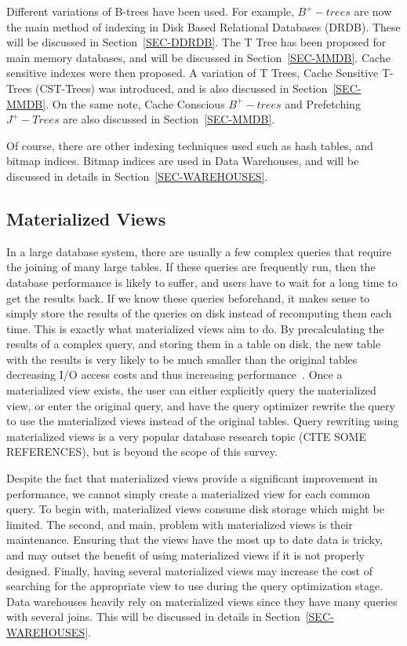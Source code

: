 \documentclass[12pt,a4paper]{article}
\begin{document}
Different variations of B-trees have been used. For example, $B^{+}-trees$ are now the main method of indexing in Disk Based Relational Databases (DRDB). These will be discussed in Section~\ref{SEC-DDRDB}. The T Tree has been proposed for main memory databases, and will be discussed in Section~\ref{SEC-MMDB}. Cache sensitive indexes were then proposed. A variation of T Trees, Cache Sensitive T-Trees (CST-Trees) was introduced, and is also discussed in Section~\ref{SEC-MMDB}. On the same note, Cache Conscious $B^{+}-trees$ and Prefetching $J^{+}-Trees$ are also discussed in Section~\ref{SEC-MMDB}. 

Of course, there are other indexing techniques used such as hash tables, and bitmap indices. Bitmap indices are used in Data Warehouses, and will be discussed in details in Section~\ref{SEC-WAREHOUSES}.

\subsection{Materialized Views}

In a large database system, there are usually a few complex queries that require the joining of many large tables. If these queries are frequently run, then the database performance is likely to suffer, and users have to wait for a long time to get the results back. If we know these queries beforehand, it makes sense to simply store the results of the queries on disk instead of recomputing them each time. This is exactly what materialized views aim to do. By precalculating the results of a complex query, and storing them in a table on disk, the new table with the results is very likely to be much smaller than the original tables decreasing I/O access costs and thus increasing performance~\cite{lightstone2007physical}. Once a materialized view exists, the user can either explicitly query the materialized view, or enter the original query, and have the query optimizer rewrite the query to use the materialized views instead of the original tables. Query rewriting using materialized views is a very popular database research topic (CITE SOME REFERENCES), but is beyond the scope of this survey.

Despite the fact that materialized views provide a significant improvement in performance, we cannot simply create a materialized view for each common query. To begin with, materialized views consume disk storage which might be limited. The second, and main, problem with materialized views is their maintenance. Ensuring that the views have the most up to date data is tricky, and may outset the benefit of using materialized views if it is not properly designed. Finally, having several materialized views may increase the cost of searching for the appropriate view to use during the query optimization stage. Data warehouses heavily rely on materialized views since they have many queries with several joins. This will be discussed in details in Section~\ref{SEC-WAREHOUSES}.
\end{document}
